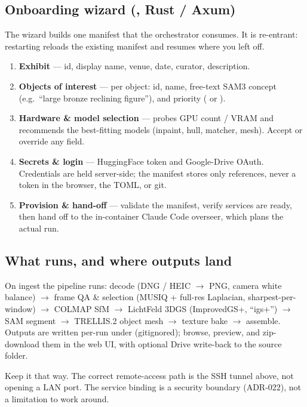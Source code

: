 \documentclass[a4paper,11pt]{article}
\begin{document}
\subsection{Onboarding wizard (, Rust / Axum)}
The wizard builds one  manifest that the orchestrator consumes. It is re-entrant:
restarting reloads the existing manifest and resumes where you left off.
\begin{enumerate}
\item \textbf{Exhibit} — id, display name, venue, date, curator, description.
\item \textbf{Objects of interest} — per object: id, name, free-text SAM3 concept (e.g.\ ``large
      bronze reclining figure''), and priority ( or ).
\item \textbf{Hardware \& model selection} — probes GPU count / VRAM and recommends the best-fitting
      models (inpaint, hull, matcher, mesh). Accept or override any field.
\item \textbf{Secrets \& login} — HuggingFace token and Google-Drive OAuth. Credentials are held
      server-side; the manifest stores only  references, never a token in the browser, the
      TOML, or git.
\item \textbf{Provision \& hand-off} — validate the manifest, verify services are ready, then hand off
      to the in-container Claude Code overseer, which plans the actual run.
\end{enumerate}

\subsection{What runs, and where outputs land}
On ingest the pipeline runs: decode (DNG / HEIC $\rightarrow$ PNG, camera white balance)
$\rightarrow$ frame QA \& selection (MUSIQ + full-res Laplacian, sharpest-per-window) $\rightarrow$
COLMAP SfM $\rightarrow$ LichtFeld 3DGS (ImprovedGS+, ``igs+'') $\rightarrow$ SAM segment
$\rightarrow$ TRELLIS.2 object mesh $\rightarrow$ texture bake $\rightarrow$ assemble. Outputs are
written per-run under  (gitignored); browse, preview, and zip-download them in the web
UI, with optional Drive write-back to the source folder.

\begin{technote}
Keep it that way. The correct remote-access path is the SSH tunnel above, not opening a LAN port.
The service binding is a security boundary (ADR-022), not a limitation to work around.
\end{technote}
\end{document}

